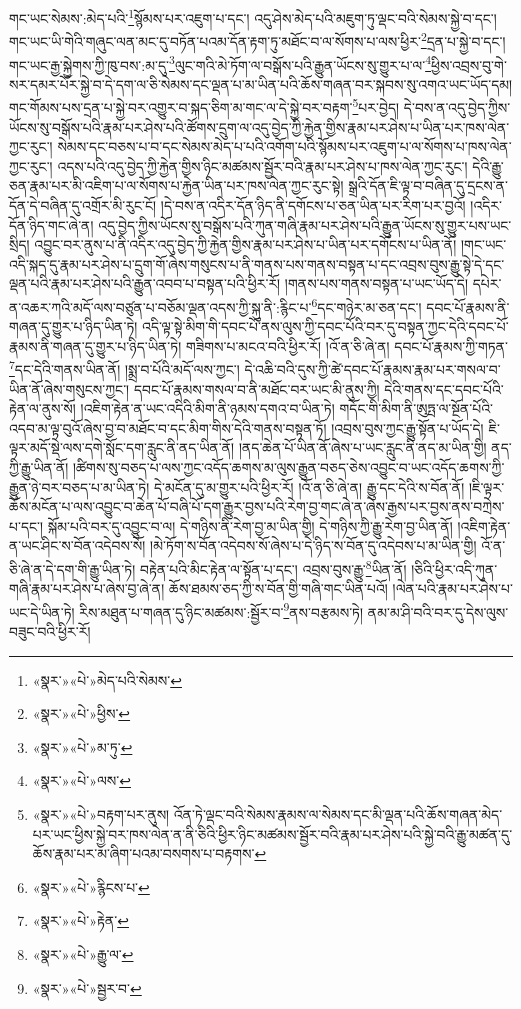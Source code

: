 གང་ཡང་སེམས་:མེད་པའི་\footnote{«སྣར་»«པེ་»མེད་པའི་སེམས་}སྙོམས་པར་འཇུག་པ་དང་། འདུ་ཤེས་མེད་པའི་མཇུག་ཏུ་ལྡང་བའི་སེམས་སྐྱེ་བ་དང་། གང་ཡང་ཡི་གེའི་གཞུང་ལན་མང་དུ་བཏོན་པའམ་དོན་རྟག་ཏུ་མཐོང་བ་ལ་སོགས་པ་ལས་ཕྱིར་\footnote{«སྣར་»«པེ་»ཕྱིས་}དྲན་པ་སྐྱེ་བ་དང་། གང་ཡང་རྒྱ་སྐྱེགས་ཀྱི་ཁུ་བས་:མ་དུ་\footnote{«སྣར་»«པེ་»མ་ཏུ་}ལུང་གའི་མེ་ཏོག་ལ་བསྒོས་པའི་རྒྱུན་ཡོངས་སུ་གྱུར་པ་ལ་\footnote{«སྣར་»«པེ་»ལས་}ཕྱིས་འབྲས་བུ་གེ་སར་དམར་པོར་སྐྱེ་བ་དེ་དག་ལ་ཅི་སེམས་དང་ལྡན་པ་མ་ཡིན་པའི་ཆོས་གཞན་བར་སྐབས་སུ་འགའ་ཡང་ཡོད་དམ། གང་གོམས་པས་དྲན་པ་སྐྱེ་བར་འགྱུར་བ་སྐད་ཅིག་མ་གང་ལ་དེ་སྐྱེ་བར་བརྟག་\footnote{«སྣར་»«པེ་»བརྟག་པར་ནུས། འོན་ཏེ་ལྡང་བའི་སེམས་རྣམས་ལ་སེམས་དང་མི་ལྡན་པའི་ཆོས་གཞན་མེད་པར་ཡང་ཕྱིས་སྐྱེ་བར་ཁས་ལེན་ན་ནི་ཅིའི་ཕྱིར་ཉིང་མཚམས་སྦྱོར་བའི་རྣམ་པར་ཤེས་པའི་སྐྱེ་བའི་རྒྱུ་མཚན་དུ་ཆོས་རྣམ་པར་མ་ཞིག་པའམ་བསགས་པ་བརྟགས་}པར་བྱེད། དེ་བས་ན་འདུ་བྱེད་ཀྱིས་ཡོངས་སུ་བསྒོས་པའི་རྣམ་པར་ཤེས་པའི་ཚོགས་དྲུག་ལ་འདུ་བྱེད་ཀྱི་རྐྱེན་གྱིས་རྣམ་པར་ཤེས་པ་ཡིན་པར་ཁས་ལེན་ཀྱང་རུང་། སེམས་དང་བཅས་པ་བ་དང་སེམས་མེད་པ་པའི་འགོག་པའི་སྙོམས་པར་འཇུག་པ་ལ་སོགས་པ་ཁས་ལེན་ཀྱང་རུང་། འདས་པའི་འདུ་བྱེད་ཀྱི་རྐྱེན་གྱིས་ཉིང་མཚམས་སྦྱོར་བའི་རྣམ་པར་ཤེས་པ་ཁས་ལེན་ཀྱང་རུང་། དེའི་རྒྱུ་ཅན་རྣམ་པར་མི་འཇིག་པ་ལ་སོགས་པ་རྐྱེན་ཡིན་པར་ཁས་ལེན་ཀྱང་རུང་སྟེ། སྒྲའི་དོན་ཇི་ལྟ་བ་བཞིན་དུ་དྲངས་ན་དོན་དེ་བཞིན་དུ་འགྲོར་མི་རུང་ངོ། །དེ་བས་ན་འདིར་དོན་ཉིད་ནི་དགོངས་པ་ཅན་ཡིན་པར་རིག་པར་བྱའོ། །འདིར་དོན་ཉིད་གང་ཞེ་ན། འདུ་བྱེད་ཀྱིས་ཡོངས་སུ་བསྒོས་པའི་ཀུན་གཞི་རྣམ་པར་ཤེས་པའི་རྒྱུན་ཡོངས་སུ་གྱུར་པས་ཡང་སྲིད། འབྱུང་བར་ནུས་པ་ནི་འདིར་འདུ་བྱེད་ཀྱི་རྐྱེན་གྱིས་རྣམ་པར་ཤེས་པ་ཡིན་པར་དགོངས་པ་ཡིན་ནོ། །གང་ཡང་འདི་སྐད་དུ་རྣམ་པར་ཤེས་པ་དྲུག་གོ་ཞེས་གསུངས་པ་ནི་གནས་པས་གནས་བསྟན་པ་དང་འབྲས་བུས་རྒྱུ་སྟེ་དེ་དང་ལྡན་པའི་རྣམ་པར་ཤེས་པའི་རྒྱུན་འབབ་པ་བསྟན་པའི་ཕྱིར་རོ། །གནས་པས་གནས་བསྟན་པ་ཡང་ཡོད་དེ། དཔེར་ན་འཆར་ཀའི་མདོ་ལས་བཙུན་པ་བཅོམ་ལྡན་འདས་ཀྱི་སྐུ་ནི་:རྙིང་པ་\footnote{«སྣར་»«པེ་»རྙིངས་པ་}དང་གཉེར་མ་ཅན་དང་། དབང་པོ་རྣམས་ནི་གཞན་དུ་གྱུར་པ་ཉིད་ཡིན་ཏེ། འདི་ལྟ་སྟེ་མིག་གི་དབང་པོ་ནས་ལུས་ཀྱི་དབང་པོའི་བར་དུ་བསྟན་ཀྱང་དེའི་དབང་པོ་རྣམས་ནི་གཞན་དུ་གྱུར་པ་ཉིད་ཡིན་ཏེ། གཟིགས་པ་མངའ་བའི་ཕྱིར་རོ། །འོ་ན་ཅི་ཞེ་ན། དབང་པོ་རྣམས་ཀྱི་གཏན་\footnote{«སྣར་»«པེ་»རྟེན་}དང་དེའི་གནས་ཡིན་ནོ། །སྨྲ་བ་པོའི་མདོ་ལས་ཀྱང་། དེ་འཆི་བའི་དུས་ཀྱི་ཚེ་དབང་པོ་རྣམས་རྣམ་པར་གསལ་བ་ཡིན་ནོ་ཞེས་གསུངས་ཀྱང་། དབང་པོ་རྣམས་གསལ་བ་ནི་མཐོང་བར་ཡང་མི་ནུས་ཀྱི། དེའི་གནས་དང་དབང་པོའི་རྟེན་ལ་ནུས་སོ། །འཇིག་རྟེན་ན་ཡང་འདིའི་མིག་ནི་ཉམས་དགའ་བ་ཡིན་ཏེ། གདོང་གི་མིག་ནི་ཨུཏྤ་ལ་སྔོན་པོའི་འདབ་མ་ལྟ་བུའོ་ཞེས་བྱ་བ་མཐོང་བ་དང་མིག་གིས་དེའི་གནས་བསྟན་ཏོ། །འབྲས་བུས་ཀྱང་རྒྱུ་སྟོན་པ་ཡོད་དེ། ཇི་ལྟར་མདོ་སྡེ་ལས་དགེ་སློང་དག་རླུང་ནི་ནད་ཡིན་ནོ། །ནད་ཆེན་པོ་ཡིན་ནོ་ཞེས་པ་ཡང་རླུང་ནི་ནད་མ་ཡིན་གྱི། ནད་ཀྱི་རྒྱུ་ཡིན་ནོ། །ཚིགས་སུ་བཅད་པ་ལས་ཀྱང་འདོད་ཆགས་མ་ལུས་རྒྱུན་བཅད་ཅེས་འབྱུང་བ་ཡང་འདོད་ཆགས་ཀྱི་རྒྱུན་ཉེ་བར་བཅད་པ་མ་ཡིན་ཏེ། དེ་མངོན་དུ་མ་གྱུར་པའི་ཕྱིར་རོ། །འོ་ན་ཅི་ཞེ་ན། རྒྱུ་དང་དེའི་ས་བོན་ནོ། །ཇི་ལྟར་ཆོས་མངོན་པ་ལས་འབྱུང་བ་ཆེན་པོ་བཞི་པོ་དག་རྒྱུར་བྱས་པའི་རེག་བྱ་གང་ཞེ་ན་ཞེས་རྒྱས་པར་བྱས་ནས་བཀྲེས་པ་དང་། སྐོམ་པའི་བར་དུ་འབྱུང་བ་ལ། དེ་གཉིས་ནི་རེག་བྱ་མ་ཡིན་གྱི། དེ་གཉིས་ཀྱི་རྒྱུ་རེག་བྱ་ཡིན་ནོ། །འཇིག་རྟེན་ན་ཡང་ཤིང་ས་བོན་འདེབས་སོ། །མེ་ཏོག་ས་བོན་འདེབས་སོ་ཞེས་པ་དེ་ཉིད་ས་བོན་དུ་འདེབས་པ་མ་ཡིན་གྱི། འོ་ན་ཅི་ཞེ་ན་དེ་དག་གི་རྒྱུ་ཡིན་ཏེ། བརྟེན་པའི་མིང་རྟེན་ལ་སྟོན་པ་དང་། འབྲས་བུས་རྒྱུ་\footnote{«སྣར་»«པེ་»རྒྱུ་ལ་}ཡིན་ནོ། །ཅིའི་ཕྱིར་འདི་ཀུན་གཞི་རྣམ་པར་ཤེས་པ་ཞེས་བྱ་ཞེ་ན། ཆོས་ཐམས་ཅད་ཀྱི་ས་བོན་གྱི་གཞི་གང་ཡིན་པའོ། །ལེན་པའི་རྣམ་པར་ཤེས་པ་ཡང་དེ་ཡིན་ཏེ། རིས་མཐུན་པ་གཞན་དུ་ཉིང་མཚམས་:སྦྱོར་བ་\footnote{«སྣར་»«པེ་»སྦྱར་བ་}ནས་བརྩམས་ཏེ། ནམ་མ་ཤི་བའི་བར་དུ་དེས་ལུས་བཟུང་བའི་ཕྱིར་རོ། 
